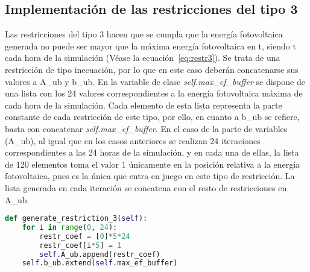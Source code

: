 \subsection{Implementación de las restricciones del tipo 3}
Las restricciones del tipo 3 hacen que se cumpla que la energía fotovoltaica generada no puede ser mayor que la máxima energía fotovoltaica en t, siendo t cada hora de la simulación (Véase la ecuación~\ref{eq:restr3}). Se trata de una restricción de tipo inecuación, por lo que en este caso deberán concatenarse sus valores a A\_ub y b\_ub. En la variable de clase \textit{self.max\_ef\_buffer} se dispone de una lista con los 24 valores correspondientes a la energía fotovoltaica máxima de cada hora de la simulación. Cada elemento de esta lista representa la parte constante de cada restricción de este tipo, por ello, en cuanto a b\_ub se refiere, basta con concatenar \textit{self.max\_ef\_buffer}. En el caso de la parte de variables (A\_ub), al igual que en los casos anteriores se realizan 24 iteraciones correspondientes a las 24 horas de la simulación, y en cada una de ellas, la lista de 120 elementos toma el valor 1 únicamente en la posición relativa a la energía fotovoltaica, pues es la única que entra en juego en este tipo de restricción. La lista generada en cada iteración se concatena con el resto de restricciones en A\_ub.
\begin{lstlisting}[language=Python,float=ht,caption={Restricciones del tipo 3},label={lst:restr3}]
def generate_restriction_3(self):
    for i in range(0, 24):
        restr_coef = [0]*5*24
        restr_coef[i*5] = 1
        self.A_ub.append(restr_coef)
    self.b_ub.extend(self.max_ef_buffer)
\end{lstlisting}

